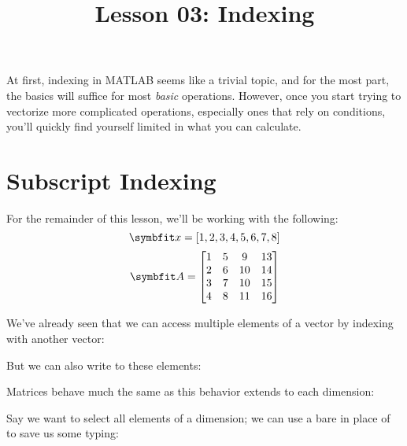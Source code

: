 \documentclass{article}
\title{Lesson 03: Indexing}
\begin{document}
\renderTitle

At first, indexing in MATLAB seems like a trivial topic, and for the
most part, the basics will suffice for most \emph{basic} operations.
However, once you start trying to vectorize more complicated operations,
especially ones that rely on conditions, you'll quickly find yourself
limited in what you can calculate.

\section{Subscript Indexing}

For the remainder of this lesson, we'll be working with the following:
\begin{equation}
	\mat{x}
	=
	[1, 2, 3, 4, 5, 6, 7, 8]
\end{equation}
\begin{equation}
	\mat{A}
	=
	\begin{bmatrix}
		1 & 5 &  9 & 13 \\
		2 & 6 & 10 & 14 \\
		3 & 7 & 10 & 15 \\
		4 & 8 & 11 & 16 \\
	\end{bmatrix}
\end{equation}

We've already seen that we can access multiple elements of a vector by
indexing with another vector:


But we can also write to these elements:


Matrices behave much the same as this behavior extends to each
dimension:


Say we want to select all elements of a dimension; we can use a bare
\mCommand{:} in place of  to save us some typing:

\end{document}
